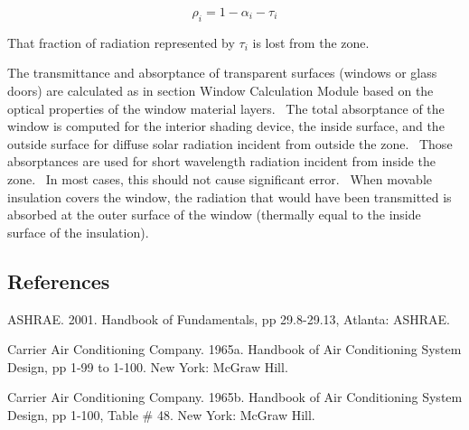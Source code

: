 \begin{equation}
{\rho_i} = 1 - {\alpha_i} - {\tau_i}
\end{equation}

That fraction of radiation represented by \({\tau_i}\) is lost from the zone.

The transmittance and absorptance of transparent surfaces (windows or glass doors) are calculated as in section Window Calculation Module based on the optical properties of the window material layers.~ The total absorptance of the window is computed for the interior shading device, the inside surface, and the outside surface for diffuse solar radiation incident from outside the zone.~ Those absorptances are used for short wavelength radiation incident from inside the zone.~ In most cases, this should not cause significant error.~ When movable insulation covers the window, the radiation that would have been transmitted is absorbed at the outer surface of the window (thermally equal to the inside surface of the insulation).

\subsection{References}\label{references-057}

ASHRAE. 2001. Handbook of Fundamentals, pp 29.8-29.13, Atlanta: ASHRAE.

Carrier Air Conditioning Company. 1965a. Handbook of Air Conditioning System Design, pp 1-99 to 1-100. New York: McGraw Hill.

Carrier Air Conditioning Company. 1965b. Handbook of Air Conditioning System Design, pp 1-100, Table \# 48. New York: McGraw Hill.
